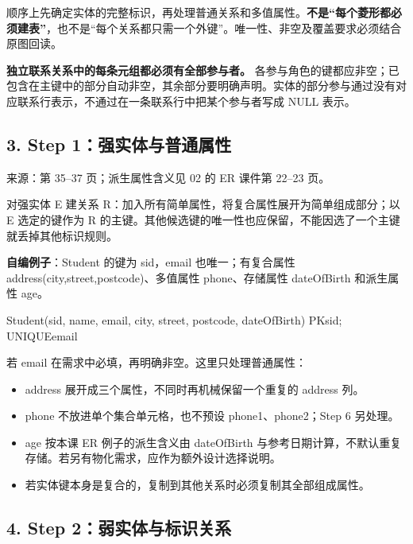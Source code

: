 顺序上先确定实体的完整标识，再处理普通关系和多值属性。\textbf{不是``每个菱形都必须建表''}，也不是``每个关系都只需一个外键''。唯一性、非空及覆盖要求必须结合原图回读。

\textbf{独立联系关系中的每条元组都必须有全部参与者。} 各参与角色的键都应非空；已包含在主键中的部分自动非空，其余部分要明确声明。实体的部分参与通过没有对应联系行表示，不通过在一条联系行中把某个参与者写成 NULL 表示。

\subsection{3. Step 1：强实体与普通属性}\label{04_er_to_relational_mapping_zh-step-1ux5f3aux5b9eux4f53ux4e0eux666eux901aux5c5eux6027}

来源：第 35--37 页；派生属性含义见 02 的 ER 课件第 22--23 页。

对强实体 E 建关系 R：加入所有简单属性，将复合属性展开为简单组成部分；以 E 选定的键作为 R 的主键。其他候选键的唯一性也应保留，不能因选了一个主键就丢掉其他标识规则。

\textbf{自编例子}：Student 的键为 sid，email 也唯一；有复合属性 address(city,street,postcode)、多值属性 phone、存储属性 dateOfBirth 和派生属性 age。

\begin{StudyCode}
Student(sid, name, email, city, street, postcode, dateOfBirth)
PK{sid}; UNIQUE{email}
\end{StudyCode}

若 email 在需求中必填，再明确非空。这里只处理普通属性：

\begin{itemize}
\tightlist
\item
  address 展开成三个属性，不同时再机械保留一个重复的 address 列。
\item
  phone 不放进单个集合单元格，也不预设 phone1、phone2；Step 6 另处理。
\item
  age 按本课 ER 例子的派生含义由 dateOfBirth 与参考日期计算，不默认重复存储。若另有物化需求，应作为额外设计选择说明。
\item
  若实体键本身是复合的，复制到其他关系时必须复制其全部组成属性。
\end{itemize}

\subsection{4. Step 2：弱实体与标识关系}\label{04_er_to_relational_mapping_zh-step-2ux5f31ux5b9eux4f53ux4e0eux6807ux8bc6ux5173ux7cfb}

